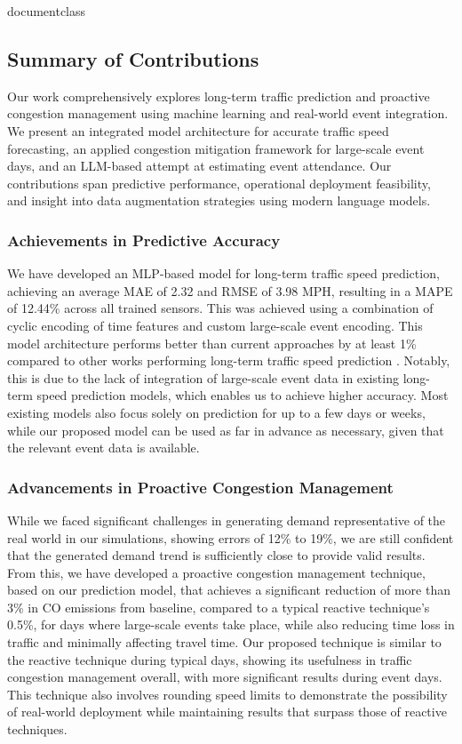 \csname documentclass
\graphicspath{{\subfix{../images/}}}


\subsection{Summary of Contributions}
Our work comprehensively explores long-term traffic prediction and proactive congestion management using machine learning and real-world event integration.  We present an integrated model architecture for accurate traffic speed forecasting, an applied congestion mitigation framework for large-scale event days, and an LLM-based attempt at estimating event attendance.  Our contributions span predictive performance, operational deployment feasibility, and insight into data augmentation strategies using modern language models.

\subsubsection{Achievements in Predictive Accuracy}
We have developed an MLP-based model for long-term traffic speed prediction, achieving an average MAE of 2.32 and RMSE of 3.98 MPH, resulting in a MAPE of 12.44\% across all trained sensors.  This was achieved using a combination of cyclic encoding of time features and custom large-scale event encoding.  This model architecture performs better than current approaches by at least 1\% compared to other works performing long-term traffic speed prediction \cite{tedjopurnomo_trafformer_2023, kara_smart_2025}.  Notably, this is due to the lack of integration of large-scale event data in existing long-term speed prediction models, which enables us to achieve higher accuracy.  Most existing models also focus solely on prediction for up to a few days or weeks, while our proposed model can be used as far in advance as necessary, given that the relevant event data is available.

\subsubsection{Advancements in Proactive Congestion Management}
While we faced significant challenges in generating demand representative of the real world in our simulations, showing errors of 12\% to 19\%, we are still confident that the generated demand trend is sufficiently close to provide valid results.  From this, we have developed a proactive congestion management technique, based on our prediction model, that achieves a significant reduction of more than 3\% in CO emissions from baseline, compared to a typical reactive technique’s 0.5\%, for days where large-scale events take place, while also reducing time loss in traffic and minimally affecting travel time.  Our proposed technique is similar to the reactive technique during typical days, showing its usefulness in traffic congestion management overall, with more significant results during event days.  This technique also involves rounding speed limits to demonstrate the possibility of real-world deployment while maintaining results that surpass those of reactive techniques.

